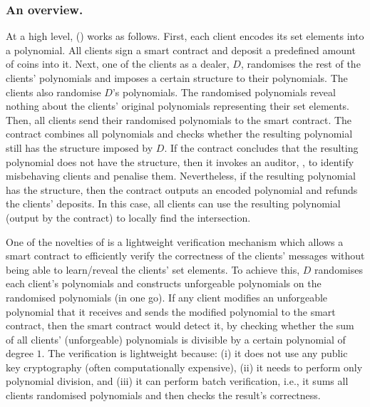 \subsubsection{An overview.} At a high level, \withFai (\fpsi) works as follows. First, each client encodes its set elements into a polynomial. All clients sign a smart contract and deposit a predefined amount of coins into it.  Next,  one of the clients as a dealer, $D$, randomises the rest of the clients' polynomials and imposes a certain structure to their polynomials. The clients also randomise $D$'s polynomials. The randomised polynomials reveal nothing about the clients' original polynomials representing their set elements. Then, all clients send their randomised polynomials to the smart contract.  The contract combines all polynomials and checks whether the resulting polynomial still has the structure imposed by $D$. If the contract concludes that the resulting polynomial does not have the structure, then it invokes an auditor, \aud, to identify misbehaving clients and penalise them. Nevertheless, if the resulting polynomial has the structure, then the contract outputs an encoded polynomial and refunds the clients' deposits. In this case, all clients can use the resulting polynomial (output by the contract) to locally find the intersection. 







One of the novelties of \fpsi is a lightweight verification mechanism which allows a smart contract to efficiently verify the correctness of the clients' messages without being able to learn/reveal the clients' set elements. To achieve this, $D$ randomises each client's polynomials and constructs unforgeable polynomials on the randomised polynomials (in one go). If any client modifies an unforgeable polynomial that it receives and sends the modified polynomial to the smart contract,  then the smart contract would detect it, by checking whether the sum of all clients' (unforgeable) polynomials is divisible by a certain polynomial of degree $1$.  The verification is lightweight because: (i) it does not use any public key cryptography (often computationally expensive), (ii) it needs to perform only polynomial division, and (iii) it can perform batch verification, i.e., it sums all clients randomised polynomials and then checks the result's correctness.






